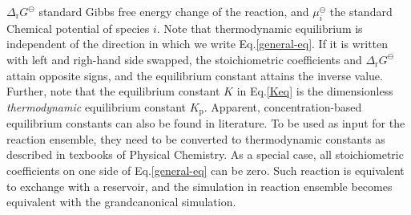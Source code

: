 $\Delta_{\mathrm{r}}G^{\ominus}$ standard Gibbs free energy change of the
reaction, and $\mu_i^{\ominus}$ the standard Chemical potential of species $i$.
Note that thermodynamic equilibrium is independent of the direction in which we
write Eq.\ref{general-eq}.  If it is written with left and righ-hand side
swapped, the stoichiometric coefficients and $\Delta_{\mathrm{r}}G^{\ominus}$
attain opposite signs, and the equilibrium constant attains the inverse value.
Further, note that the equilibrium constant $K$ in Eq.\ref{Keq} is the dimensionless
\emph{thermodynamic} equilibrium constant $K_\mathrm{p}$.  Apparent,
concentration-based equilibrium constants can also be found in literature.  To
be used as input for the reaction ensemble, they need to be converted to
thermodynamic constants as described in texbooks of Physical Chemistry.
As a special case, all stoichiometric coefficients on one side
of Eq.\ref{general-eq} can be zero. Such reaction is equivalent
to exchange with a reservoir, and the simulation in reaction ensemble becomes equivalent
with the grandcanonical simulation.

